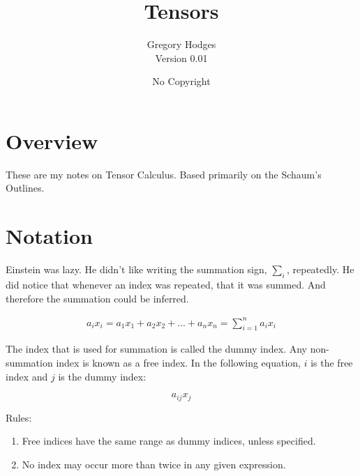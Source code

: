 \documentclass{article}
\begin{document}
\title{Tensors}
\author{Gregory Hodges\\Version 0.01}
\date{No Copyright}
\maketitle



%
%

\tableofcontents

%
%
\newpage
\section{Overview}

These are my notes on Tensor Calculus.  Based primarily on the Schaum's Outlines.


%
%
\newpage
\section{Notation}

\noindent
Einstein was lazy.  He didn't like writing the summation sign, $\sum_{i}$, repeatedly.  He did notice that whenever an index was repeated, that it was summed.  And therefore the summation could be inferred.

\begin{align*}
a_i x_i = a_1 x_1 + a_2 x_2 + ... + a_n x_n = \sum_{i = 1}^n a_i x_i
\end{align*}

\noindent
The index that is used for summation is called the dummy index.  Any non-summation index is known as a free index.  In the following equation, $i$ is the free index and $j$ is the dummy index:

\begin{equation}
a_{ij} x_j
\end{equation}

\noindent
Rules:

\begin{enumerate}
	\item Free indices have the same range as dummy indices, unless specified.
	\item No index may occur more than twice in any given expression.  
\end{enumerate}
\end{document}
